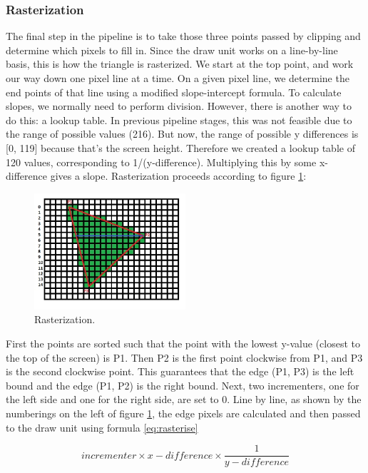 \documentclass[onecolumn]{IEEEtran}
\begin{document}
\subsubsection{Rasterization}
The final step in the pipeline is to take those three points passed by clipping and determine which pixels to fill in.  Since the draw unit works on a line-by-line basis, this is how the triangle is rasterized.  We start at the top point, and work our way down one pixel line at a time.  On a given pixel line, we determine the end points of that line using a modified slope-intercept formula.  To calculate slopes, we normally need to perform division.  However, there is another way to do this: a lookup table.  In previous pipeline stages, this was not feasible due to the range of possible values (216).  But now, the range of possible y differences is [0, 119] because that’s the screen height.  Therefore we created a lookup table of 120 values, corresponding to 1/(y-difference).  Multiplying this by some x-difference gives a slope.  Rasterization proceeds according to figure \ref{fig:rasteriser}:

\begin{figure}[H]
	\centering
	\includegraphics[width=0.5\textwidth]{rasteriser.png}
	\caption{Rasterization.}
	\label{fig:rasteriser}
\end{figure}

First the points are sorted such that the point with the lowest y-value (closest to the top of the screen) is P1.  Then P2 is the first point clockwise from P1, and P3 is the second clockwise point.  This guarantees that the edge (P1, P3) is the left bound and the edge (P1, P2) is the right bound.  Next, two incrementers, one for the left side and one for the right side, are set to 0.  Line by line, as shown by the numberings on the left of figure \ref{fig:rasteriser}, the edge pixels are calculated and then passed to the draw unit using formula \ref{eq:rasterise}

\begin{equation}
	\label{eq:rasterise}
	incrementer \times x-difference \times \frac{1}{y-difference}  
\end{equation}
\end{document}
